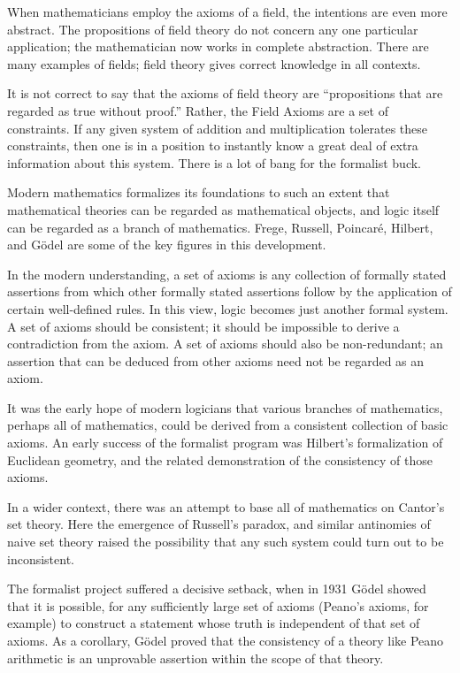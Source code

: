 \documentclass[12pt]{article}
\begin{document}
When mathematicians employ the axioms of a field, the intentions are
even more abstract. The propositions of field theory do not concern
any one particular application; the mathematician now works in
complete abstraction.  There are many examples of fields; field
theory gives correct knowledge in all contexts.

It is not correct to say that the axioms of field theory are
``propositions that are regarded as true without proof.''  Rather, the
Field Axioms are a set of constraints.  If any given system of
addition and multiplication tolerates these constraints, then one is
in a position to instantly know a great deal of extra information
about this system. There is a lot of bang for the formalist buck.

Modern mathematics formalizes its foundations to such an
extent that mathematical theories can be regarded as mathematical
objects, and logic itself can be regarded as a branch of mathematics.
Frege, Russell, Poincar\'e, Hilbert, and G\"odel are some of
the key figures in this development.

In the modern understanding, a set of axioms is any collection of
formally stated assertions from which other formally stated assertions
follow by the application of certain well-defined rules.  In this
view, logic becomes just another formal system.  A set of axioms
should be consistent; it should be impossible to derive a
contradiction from the axiom.  A set of axioms should also be
non-redundant; an assertion that can be deduced from other axioms need
not be regarded as an axiom.

It was the early hope of modern logicians that various branches of
mathematics, perhaps all of mathematics, could be derived from a
consistent collection of basic axioms.  An early success of the
formalist program was Hilbert's formalization of Euclidean geometry,
and the related demonstration of the consistency of those axioms.

In a wider context, there was an attempt to base all of mathematics on
Cantor's set theory.  Here the emergence of Russell's paradox, and
similar antinomies of naive set theory raised the possibility that any
such system could turn out to be inconsistent.

The formalist project suffered a decisive setback, when in 1931
G\"odel showed that it is possible, for any sufficiently large set of
axioms (Peano's axioms, for example) to construct a statement whose
truth is independent of that set of axioms.  As a corollary, G\"odel
proved that the consistency of a theory like Peano arithmetic is an
unprovable assertion within the scope of that theory.
\end{document}

